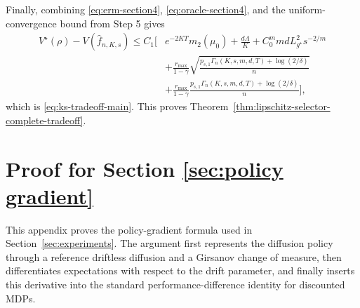 \documentclass{article}
\newcommand{\1}{\mathbbm{1}}
\numberwithin{equation}{section}
\begin{document}
\medskip

Finally, combining \eqref{eq:erm-section4}, \eqref{eq:oracle-section4}, and the uniform-convergence bound from Step 5 gives
\begin{align*}
 V^\star(\rho)-V(\widehat f_{n,K,s})
 \le C_1\Bigg[&
 e^{-2KT}m_2(\mu_0)+\frac{d\Lambda}{K}+C_0^mmdL_{g^\star}^2s^{-2/m} \\
 &+\frac{r_{\max}}{1-\gamma}
 \sqrt{\frac{p_{s,1}\Gamma_n(K,s,m,d,T)+\log(2/\delta)}{n}} \\
 &+\frac{r_{\max}}{1-\gamma}
 \frac{p_{s,1}\Gamma_n(K,s,m,d,T)+\log(2/\delta)}{n}
 \Bigg],
\end{align*}
which is \eqref{eq:ks-tradeoff-main}. This proves Theorem~\ref{thm:lipschitz-selector-complete-tradeoff}.

\section{Proof for Section \ref{sec:policy gradient}}\label{app:policy-gradient}


This appendix proves the policy-gradient formula used in Section~\ref{sec:experiments}. The argument first represents the diffusion policy through a reference driftless diffusion and a Girsanov change of measure, then differentiates expectations with respect to the drift parameter, and finally inserts this derivative into the standard performance-difference identity for discounted MDPs.
\end{document}
